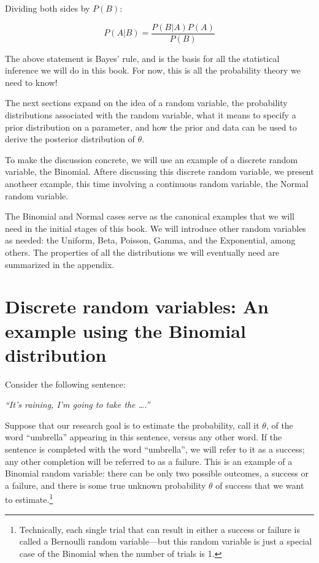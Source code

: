 \documentclass[12pt,]{krantz}
\theoremstyle{definition}
\theoremstyle{definition}
\theoremstyle{definition}
\theoremstyle{remark}
\begin{document}
Dividing both sides by \(P(B)\):

\begin{equation}
P(A|B)=\frac{P(B|A)P(A)}{P(B)}
\end{equation}

The above statement is Bayes' rule, and is the basis for all the statistical inference we will do in this book. For now, this is all the probability theory we need to know!

The next sections expand on the idea of a random variable, the probability distributions associated with the random variable, what it means to specify a prior distribution on a parameter, and how the prior and data can be used to derive the posterior distribution of \(\theta\).

To make the discussion concrete, we will use an example of a discrete random variable, the Binomial. Aftere discussing this discrete random variable, we present anotheer example, this time involving a continuous random variable, the Normal random variable.

The Binomial and Normal cases serve as the canonical examples that we will need in the initial stages of this book. We will introduce other random variables as needed: the Uniform, Beta, Poisson, Gamma, and the Exponential, among others. The properties of all the distributions we will eventually need are summarized in the appendix.

\hypertarget{sec:binomialcloze}{%
\section{Discrete random variables: An example using the Binomial distribution}\label{sec:binomialcloze}}

Consider the following sentence:

\emph{``It's raining, I'm going to take the \ldots{}.''}

Suppose that our research goal is to estimate the probability, call it \(\theta\), of the word ``umbrella'' appearing in this sentence, versus any other word. If the sentence is completed with the word ``umbrella'', we will refer to it as a success; any other completion will be referred to as a failure. This is an example of a Binomial random variable: there can be only two possible outcomes, a success or a failure, and there is some true unknown probability \(\theta\) of success that we want to estimate.\footnote{Technically, each single trial that can result in either a success or failure is called a Bernoulli random variable---but this random variable is just a special case of the Binomial when the number of trials is 1.}
\end{document}
